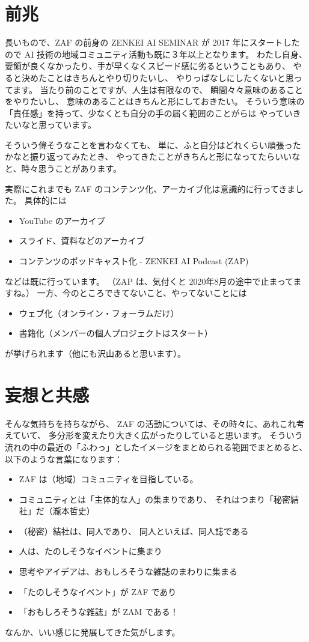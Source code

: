 \documentclass[dvipdfmx,autodetect-engine,10pt,b5paper,papersize,openany,dvipsnames]{jsbook}
\begin{document}
\begin{multicols}{2}


\section{前兆}
長いもので、ZAF の前身の ZENKEI AI SEMINAR が 2017 年にスタートしたので
AI 技術の地域コミュニティ活動も既に３年以上となります。
わたし自身、要領が良くなかったり、手が早くなくスピード感に劣るということもあり、
やると決めたことはきちんとやり切りたいし、
やりっぱなしにしたくないと思ってます。
当たり前のことですが、人生は有限なので、
瞬間々々意味のあることをやりたいし、
意味のあることはきちんと形にしておきたい。
そういう意味の「責任感」を持って、少なくとも自分の手の届く範囲のことがらは
やっていきたいなと思っています。

そういう偉そうなことを言わなくても、
単に、ふと自分はどれくらい頑張ったかなと振り返ってみたとき、
やってきたことがきちんと形になってたらいいなと、時々思うことがあります。

実際にこれまでも ZAF のコンテンツ化、アーカイブ化は意識的に行ってきました。
具体的には
\begin{itemize}
\item YouTube のアーカイブ
\item スライド、資料などのアーカイブ
\item コンテンツのポッドキャスト化 - ZENKEI AI Podcast (ZAP)
\end{itemize}
などは既に行っています。
（ZAP は、気付くと 2020年8月の途中で止まってますね。）
一方、今のところできてないこと、やってないことには
\begin{itemize}
\item ウェブ化（オンライン・フォーラムだけ）
\item 書籍化（メンバーの個人プロジェクトはスタート）
\end{itemize}
が挙げられます（他にも沢山あると思います）。


\section{妄想と共感}
そんな気持ちを持ちながら、
ZAF の活動については、その時々に、あれこれ考えていて、
多分形を変えたり大きく広がったりしていると思います。
そういう流れの中の最近の「ふわっ」としたイメージをまとめられる範囲でまとめると、
以下のような言葉になります：
\begin{itemize}
\item ZAF は（地域）コミュニティを目指している。
\item コミュニティとは「主体的な人」の集まりであり、
  それはつまり「秘密結社」だ（瀧本哲史）
\item （秘密）結社は、同人であり、
  同人といえば、同人誌である
\item 人は、たのしそうなイベントに集まり
\item 思考やアイデアは、おもしろそうな雑誌のまわりに集まる
\item 「たのしそうなイベント」が ZAF であり
\item 「おもしろそうな雑誌」が ZAM である！
\end{itemize}
なんか、いい感じに発展してきた気がします。


\end{multicols}
\end{document}
